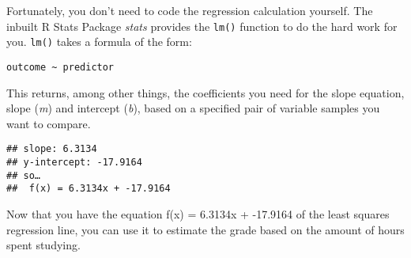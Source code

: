 \documentclass[
]{article}
\newenvironment{Shaded}{\begin{snugshade}}{\end{snugshade}}
\newcommand{\AttributeTok}[1]{\textcolor[rgb]{0.77,0.63,0.00}{#1}}
\newcommand{\CommentTok}[1]{\textcolor[rgb]{0.56,0.35,0.01}{\textit{#1}}}
\newcommand{\DecValTok}[1]{\textcolor[rgb]{0.00,0.00,0.81}{#1}}
\newcommand{\FunctionTok}[1]{\textcolor[rgb]{0.00,0.00,0.00}{#1}}
\newcommand{\NormalTok}[1]{#1}
\newcommand{\OtherTok}[1]{\textcolor[rgb]{0.56,0.35,0.01}{#1}}
\newcommand{\SpecialCharTok}[1]{\textcolor[rgb]{0.00,0.00,0.00}{#1}}
\newcommand{\StringTok}[1]{\textcolor[rgb]{0.31,0.60,0.02}{#1}}
\begin{document}
Fortunately, you don't need to code the regression calculation yourself.
The inbuilt R Stats Package \emph{stats} provides the \texttt{lm()}
function to do the hard work for you. \texttt{lm()} takes a formula of
the form:

\texttt{outcome\ \textasciitilde{}\ predictor}

This returns, among other things, the coefficients you need for the
slope equation, slope (\emph{m}) and intercept (\emph{b}), based on a
specified pair of variable samples you want to compare.

\begin{Shaded}
\end{Shaded}

\begin{verbatim}
## slope: 6.3134
## y-intercept: -17.9164
## so…
##  f(x) = 6.3134x + -17.9164
\end{verbatim}

Now that you have the equation f(x) = 6.3134x + -17.9164 of the least
squares regression line, you can use it to estimate the grade based on
the amount of hours spent studying.
\end{document}
